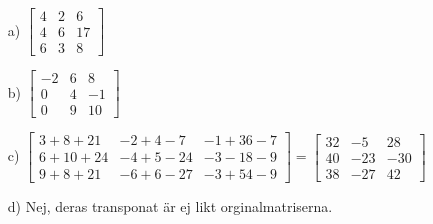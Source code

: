 \begin{itemize}
	\item[a) ] 	$\begin{bmatrix} 
				4&2 &6 \\
				4&6 &17\\
				6&3 &8
				\end{bmatrix}$
	\item[b) ] $\begin{bmatrix} 
				-2&6 &8 \\
				0&4 &-1\\
				0&9 &10
				\end{bmatrix}$
	\item[c) ] $\begin{bmatrix} 
				3+8+21 &-2+4-7 &-1+36-7\\
				6+10+24 &-4+5-24 &-3-18-9\\
				9+8+21 &-6+6-27 &-3+54-9
				\end{bmatrix}
				=\begin{bmatrix} 
				32 &-5 &28\\
				40 &-23 &-30\\
				38 &-27 &42
				\end{bmatrix}$
	\item[d) ] Nej, deras transponat är ej likt orginalmatriserna.
\end{itemize}
